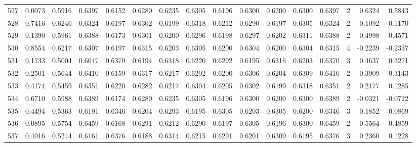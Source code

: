 \begin{tabular}{lrrrrrrrrrrrrrrr}
527 &      0.0073 &  0.5916 &  0.6397 &  0.6152 &  0.6280 &  0.6235 &  0.6305 &  0.6196 &  0.6300 &  0.6200 &   0.6300 &     0.6397 &      2 &                    0.6324 &                     0.5843 \\
528 &      0.7416 &  0.6246 &  0.6324 &  0.6197 &  0.6302 &  0.6199 &  0.6318 &  0.6212 &  0.6290 &  0.6197 &   0.6305 &     0.6324 &      2 &                   -0.1092 &                    -0.1170 \\
529 &      0.1390 &  0.5961 &  0.6388 &  0.6173 &  0.6301 &  0.6200 &  0.6296 &  0.6198 &  0.6297 &  0.6202 &   0.6311 &     0.6388 &      2 &                    0.4998 &                     0.4571 \\
530 &      0.8554 &  0.6217 &  0.6307 &  0.6197 &  0.6315 &  0.6203 &  0.6305 &  0.6200 &  0.6304 &  0.6200 &   0.6304 &     0.6315 &      4 &                   -0.2239 &                    -0.2337 \\
531 &      0.1733 &  0.5004 &  0.6047 &  0.6370 &  0.6194 &  0.6318 &  0.6220 &  0.6292 &  0.6195 &  0.6316 &   0.6203 &     0.6370 &      3 &                    0.4637 &                     0.3271 \\
532 &      0.2501 &  0.5644 &  0.6410 &  0.6159 &  0.6317 &  0.6217 &  0.6292 &  0.6200 &  0.6306 &  0.6204 &   0.6309 &     0.6410 &      2 &                    0.3909 &                     0.3143 \\
533 &      0.4174 &  0.5459 &  0.6351 &  0.6220 &  0.6282 &  0.6217 &  0.6304 &  0.6205 &  0.6302 &  0.6199 &   0.6318 &     0.6351 &      2 &                    0.2177 &                     0.1285 \\
534 &      0.6710 &  0.5988 &  0.6389 &  0.6174 &  0.6280 &  0.6235 &  0.6305 &  0.6196 &  0.6300 &  0.6200 &   0.6300 &     0.6389 &      2 &                   -0.0321 &                    -0.0722 \\
535 &      0.4494 &  0.5363 &  0.6191 &  0.6346 &  0.6204 &  0.6293 &  0.6195 &  0.6305 &  0.6203 &  0.6305 &   0.6200 &     0.6346 &      3 &                    0.1852 &                     0.0869 \\
536 &      0.0895 &  0.5754 &  0.6459 &  0.6168 &  0.6291 &  0.6212 &  0.6290 &  0.6197 &  0.6305 &  0.6196 &   0.6300 &     0.6459 &      2 &                    0.5564 &                     0.4859 \\
537 &      0.4016 &  0.5244 &  0.6161 &  0.6376 &  0.6188 &  0.6314 &  0.6215 &  0.6291 &  0.6201 &  0.6309 &   0.6195 &     0.6376 &      3 &                    0.2360 &                     0.1228 \\

\end{tabular}
